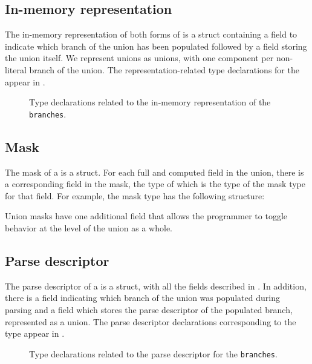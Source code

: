 %


\subsection{In-memory representation}
\label{sec:unions-rep}
The in-memory representation of both forms of \Punion{} is 
a \C{} struct containing a  field to indicate which branch of the
union has been populated followed by a  field storing the union
itself.  We represent unions as \C{} unions, with one component per
non-literal branch of the union.  
The representation-related type declarations for
the \Punion{}  appear in .

\begin{figure}
\caption{Type declarations related to the in-memory representation of
  the \Punion{} \texttt{branches}.}
\label{fig:punion-rep}
\end{figure}

\subsection{Mask}
\label{sec:unions-masks}
The mask of a \Punion{} is a \C{} struct.  
For each full and computed field in the union,
there is a corresponding field in the mask, the type of which is the
type of the mask type for that field.   For example, the mask type
 has the following structure:

%
\noindent
Union masks have one additional field  that allows the
programmer to toggle behavior at the level of the union as a whole.

\subsection{Parse descriptor}
\label{sec:unions-parse-descriptors}
The parse descriptor of a \Punion{} is a \C{} struct, with all
the fields described in . In
addition,  there is a  field indicating which branch of the
union was populated during parsing and a  field which stores
the parse descriptor of the populated branch, represented as a \C{}
union.  The parse descriptor declarations corresponding to the
\pads{} type 
appear in .

\begin{figure}
\caption{Type declarations related to the parse descriptor for
  the \Punion{} \texttt{branches}.}
\label{fig:punion-pd}
\end{figure}


